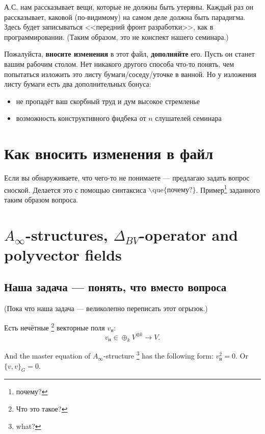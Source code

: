 \documentclass[11pt]{article}
\theoremstyle{remark}
\theoremstyle{definition}
\newcommand{\que}[1]{\footnote{\textcolor[rgb]{0.38,0.69,0.82}{#1}}}
\begin{document}
\baselineskip14pt
\bigskip


\tableofcontents
\bigskip
\bigskip


А.С. нам рассказывает вещи, которые не должны быть утеряны. Каждый раз он рассказывает, каковой (по-видимому) на самом деле должна быть парадигма. Здесь будет записываться <<передний фронт разработки>>, как в программировании. (Таким образом, это не конспект нашего семинара.)

Пожалуйста, \textbf{вносите изменения} в этот файл, \textbf{дополняйте} его. Пусть он станет вашим рабочим столом. Нет никакого другого способа что-то понять, чем попытаться изложить это листу бумаги/соседу/уточке в ванной. Но у изложения листу бумаги есть два дополнительных бонуса:
\begin{itemize}
  \item не пропадёт ваш скорбный труд и дум высокое стремленье
  \item возможность конструктивного фидбека от $n$ слушателей семинара
\end{itemize}

\section{Как вносить изменения в файл}

Если вы обнаруживаете, что чего-то не понимаете --- предлагаю задать вопрос сноской. Делается это с помощью синтаксиса $\backslash \text{que} \{ \text{почему?} \}$. Пример\que{почему?} заданного таким образом вопроса.

\newpage

\section{$A_{\infty}$-structures, $\Delta_{BV}$-operator and polyvector fields}

\subsection{Наша задача --- понять, что вместо вопроса}

(Пока что наша задача --- великолепно переписать этот огрызок.)

Есть нечётные \que{Что это такое?} векторные поля $v_{\text{н}}$: $$v_{\text{н}} \in \oplus_k V^{\otimes k} \to V.$$

And the master equation of $A_{\infty}$-structure \que{what?} has the following form: $v_{\text{н}}^2 = 0.$ Or $\{v,v\}_G = 0.$
\end{document}

